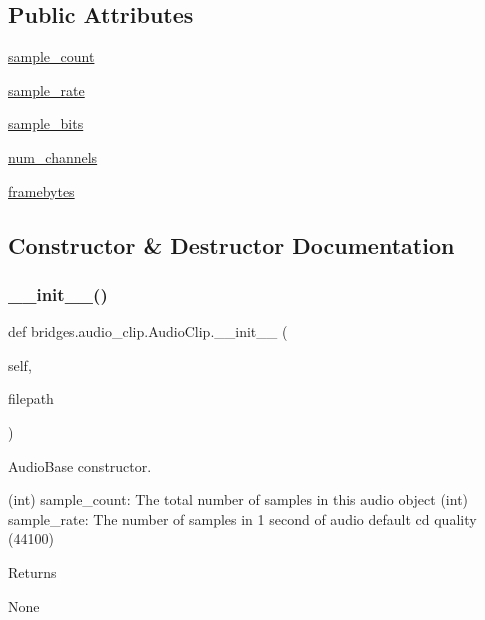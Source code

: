\subsection*{Public Attributes}
\begin{DoxyCompactItemize}
\item 
\hyperlink{classbridges_1_1audio__clip_1_1_audio_clip_ac9551b041b0d6b7e7b2a1db623c56159}{sample\+\_\+count}
\item 
\hyperlink{classbridges_1_1audio__clip_1_1_audio_clip_a265e017578bdd94664f308f51b596c6d}{sample\+\_\+rate}
\item 
\hyperlink{classbridges_1_1audio__clip_1_1_audio_clip_a274e7ae8cd17a96d068265795b9c0718}{sample\+\_\+bits}
\item 
\hyperlink{classbridges_1_1audio__clip_1_1_audio_clip_ace413dc6646f965e2d0f75e1d84000c9}{num\+\_\+channels}
\item 
\hyperlink{classbridges_1_1audio__clip_1_1_audio_clip_a8af93e6689978881cc60e7cdf4092ce7}{framebytes}
\end{DoxyCompactItemize}


\subsection{Constructor \& Destructor Documentation}
\mbox{\label{classbridges_1_1audio__clip_1_1_audio_clip_aa159be044564628f5c87dc1e988e2b4e}} 
\subsubsection{\texorpdfstring{\+\_\+\+\_\+init\+\_\+\+\_\+()}{\_\_init\_\_()}}
{\footnotesize\ttfamily def bridges.\+audio\+\_\+clip.\+Audio\+Clip.\+\_\+\+\_\+init\+\_\+\+\_\+ (\begin{DoxyParamCaption}\item[{}]{self,  }\item[{}]{filepath }\end{DoxyParamCaption})}



Audio\+Base constructor. 

(int) sample\+\_\+count\+: The total number of samples in this audio object (int) sample\+\_\+rate\+: The number of samples in 1 second of audio default cd quality (44100) \begin{DoxyReturn}{Returns}


None 
\end{DoxyReturn}


